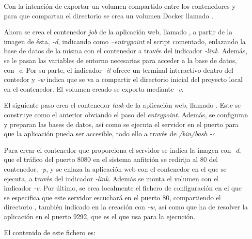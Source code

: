 Con la intención de exportar un volumen compartido entre los contenedores  y  para que compartan el directorio  se crea un volumen Docker llamado .

Ahora se crea el contenedor \textit{job} de la aplicación web, llamado , a partir de la imagen de ésta, \textit{\--d}, indicando como \textit{\---entrypoint} el script comentado, enlazando la base de datos de la misma con el contenedor  a través del indicador \textit{\--link}. Además, se le pasan las variables de entorno necesarias para acceder a la base de datos, con \textit{\--e}. Por su parte, el indicador \textit{\--it} ofrece un terminal interactivo dentro del contedor y \textit{\--w} indica que se va a compartir el directorio inicial del proyecto local en el contenedor. El volumen creado se exporta mediante \textit{\--v}.

El siguiente paso crea el contenedor \textit{task} de la aplicación web, llamado . Este se construye como el anterior obviando el paso del \textit{entrypoint}. Además, se configuran y preparan las bases de datos, así como se ejecuta el servidor  en el puerto  para que la aplicación pueda ser accesible, todo ello a través de \textit{/bin/bash \--c}

Para crear el contenedor  que proporciona el servidor  se indica la imagen con \textit{\--d}, que el tráfico del puerto 8080 en el sistema anfitrión se redirija al 80 del contenedor, \textit{\--p}, y se enlaza la aplicación web con el contenedor en el que se ejecuta, a través del indicador \textit{\--link}. Además se monta el volumen  con el indicador \textit{\--v}. Por último, se crea localmente el fichero de configuración  en el que se especifica que este servidor escuchará en el puerto 80, compartiendo el directorio , también indicado en la creación con \textit{\--w}, así como que ha de resolver la aplicación en el puerto 9292, que es el que usa  para la ejecución.  

El contenido de este fichero es: 
\begin{codelisting}
\label{code:nginxconf}
\end{codelisting}

